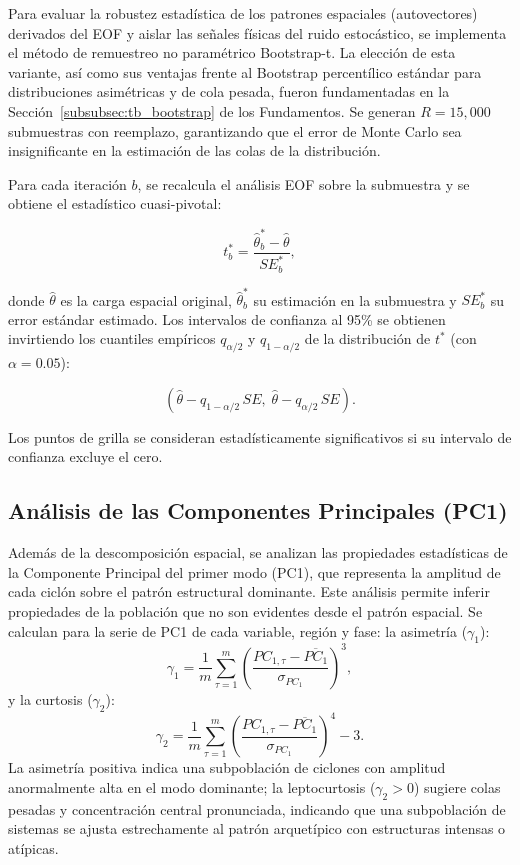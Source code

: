 Para evaluar la robustez estadística de los patrones espaciales (autovectores) derivados del EOF y aislar las señales físicas del ruido estocástico, se implementa el método de remuestreo no paramétrico Bootstrap-t. La elección de esta variante, así como sus ventajas frente al Bootstrap percentílico estándar para distribuciones asimétricas y de cola pesada, fueron fundamentadas en la Sección~\ref{subsubsec:tb_bootstrap} de los Fundamentos. Se generan $R = 15{,}000$ submuestras con reemplazo, garantizando que el error de Monte Carlo sea insignificante en la estimación de las colas de la distribución.

Para cada iteración $b$, se recalcula el análisis EOF sobre la submuestra y se obtiene el estadístico cuasi-pivotal:

\begin{equation}
    t^*_b = \frac{\hat{\theta}^*_b - \hat{\theta}}{SE^*_b},
\end{equation}

donde $\hat{\theta}$ es la carga espacial original, $\hat{\theta}^*_b$ su estimación en la submuestra y $SE^*_b$ su error estándar estimado. Los intervalos de confianza al 95\% se obtienen invirtiendo los cuantiles empíricos $q_{\alpha/2}$ y $q_{1-\alpha/2}$ de la distribución de $t^*$ (con $\alpha = 0.05$):

\begin{equation}
    \left(\hat{\theta} - q_{1-\alpha/2}\,SE,\; \hat{\theta} - q_{\alpha/2}\,SE\right).
\end{equation}

Los puntos de grilla se consideran estadísticamente significativos si su intervalo de confianza excluye el cero.

\subsection{Análisis de las Componentes Principales (PC1)}\label{subsec:analisis_pc}

Además de la descomposición espacial, se analizan las propiedades estadísticas de la Componente Principal del primer modo (PC1), que representa la amplitud de cada ciclón sobre el patrón estructural dominante. Este análisis permite inferir propiedades de la población que no son evidentes desde el patrón espacial. Se calculan para la serie de PC1 de cada variable, región y fase: la asimetría ($\gamma_1$):
\begin{equation}
    \gamma_1 = \frac{1}{m} \sum_{\tau=1}^{m} \left(\frac{PC_{1,\tau} - \overline{PC_1}}{\sigma_{PC_1}}\right)^3,
\end{equation}
y la curtosis ($\gamma_2$):
\begin{equation}
    \gamma_2 = \frac{1}{m} \sum_{\tau=1}^{m} \left(\frac{PC_{1,\tau} - \overline{PC_1}}{\sigma_{PC_1}}\right)^4 - 3.
\end{equation}
La asimetría positiva indica una subpoblación de ciclones con amplitud anormalmente alta en el modo dominante; la leptocurtosis ($\gamma_2 > 0$) sugiere colas pesadas y concentración central pronunciada, indicando que una subpoblación de sistemas se ajusta estrechamente al patrón arquetípico con estructuras intensas o atípicas.

